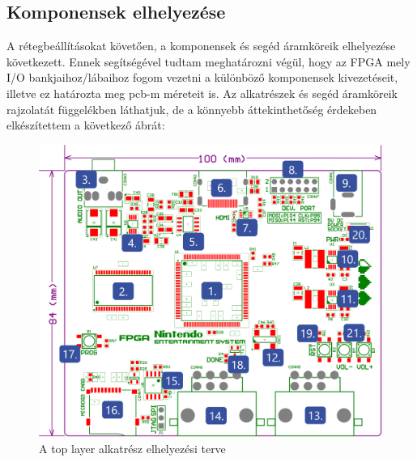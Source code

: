	\subsection{Komponensek elhelyezése}
	
	A rétegbeállításokat követően, a komponensek és segéd áramköreik elhelyezése következett. Ennek segítségével tudtam meghatározni végül, hogy az FPGA mely I/O bankjaihoz/lábaihoz fogom vezetni a különböző komponensek kivezetéseit, illetve ez határozta meg pcb-m méreteit is. Az alkatrészek és segéd áramköreik rajzolatát  függelékben láthatjuk, de a könnyebb áttekinthetőség érdekeben elkészítettem a következő ábrát:
	
	\begin{figure}[H]
		\centering
		\includegraphics[width=135mm, keepaspectratio]{figures/components-top}
		\caption{A top layer alkatrész elhelyezési terve} 
		\label{fig:NES-components-top}
	\end{figure}
	
